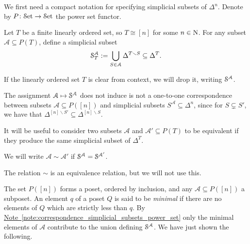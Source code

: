 \documentclass[main.tex]{subfiles}
\begin{document}
We first need a compact notation for specifying simplicial subsets of $\Delta^{n}$. Denote by $P\colon \Set \to \Set$ the power set functor.

\begin{definition}
  Let $T$ be a finite linearly ordered set, so $T \cong [n]$ for some $n \in \N$. For any subset $\mathcal{A} \subseteq  P(T)$, define a simplicial subset
  \begin{equation*}
    \S^{\mathcal{A}}_{T} := \bigcup_{S \in \mathcal{A}} \Delta^{T \smallsetminus S} \subseteq \Delta^{T}.
  \end{equation*}
\end{definition}

\begin{notation}
  If the linearly ordered set $T$ is clear from context, we will drop it, writing $\S^{\mathcal{A}}$.
\end{notation}

\begin{note}
  \label{note:correspondence_simplicial_subsets_power_set}
  The assignment $\mathcal{A} \mapsto \S^{\mathcal{A}}$ does not induce is not a one-to-one correspondence between subsets $\mathcal{A} \subseteq P([n])$ and simplicial subsets $S^{\mathcal{A}} \subseteq \Delta^{n}$, since for $S \subsetneq S'$, we have that $\Delta^{[n] \smallsetminus S'} \subseteq \Delta^{[n] \smallsetminus S}$.
\end{note}

It will be useful to consider two subsets $\mathcal{A}$ and $\mathcal{A}' \subseteq P(T)$ to be equivalent if they produce the same simplicial subset of $\Delta^{T}$.

\begin{definition}
  We will write $\mathcal{A} \sim \mathcal{A}'$ if $\S^{\mathcal{A}} = \S^{\mathcal{A}'}$.
\end{definition}

The relation $\sim$ is an equivalence relation, but we will not use this.

The set $P([n])$ forms a poset, ordered by inclusion, and any $\mathcal{A} \subseteq P([n])$ a subposet. An element $q$ of a poset $Q$ is said to be \emph{minimal} if there are no elements of $Q$ which are strictly less than $q$. By \hyperref[note:correspondence_simplicial_subsets_power_set]{Note~\ref*{note:correspondence_simplicial_subsets_power_set}} only the minimal elements of $\mathcal{A}$ contribute to the union defining $\S^{\mathcal{A}}$. We have just shown the following.
\end{document}
